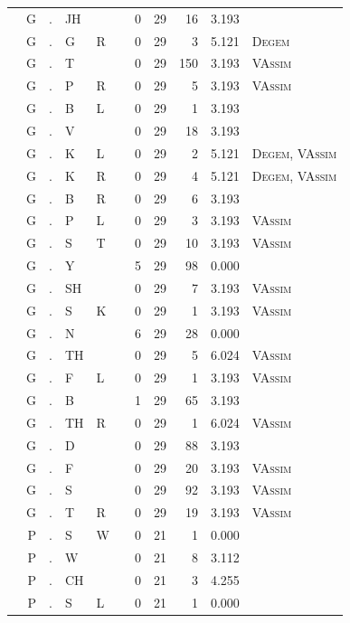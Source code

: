 \documentclass[12pt]{article}
\begin{document}
\begin{longtable}{r@{ } r@{ } c@{ } l@{ } l@{ } l@{ } r r r r l }
 & G & . & JH &  &  & 0 & 29 & 16 & 3.193 &  \\
 & G & . & G & R &  & 0 & 29 & 3 & 5.121 & \textsc{Degem} \\
 & G & . & T &  &  & 0 & 29 & 150 & 3.193 & \textsc{VAssim} \\
 & G & . & P & R &  & 0 & 29 & 5 & 3.193 & \textsc{VAssim} \\
 & G & . & B & L &  & 0 & 29 & 1 & 3.193 &  \\
 & G & . & V &  &  & 0 & 29 & 18 & 3.193 &  \\
 & G & . & K & L &  & 0 & 29 & 2 & 5.121 & \textsc{Degem}, \textsc{VAssim} \\
 & G & . & K & R &  & 0 & 29 & 4 & 5.121 & \textsc{Degem}, \textsc{VAssim} \\
 & G & . & B & R &  & 0 & 29 & 6 & 3.193 &  \\
 & G & . & P & L &  & 0 & 29 & 3 & 3.193 & \textsc{VAssim} \\
 & G & . & S & T &  & 0 & 29 & 10 & 3.193 & \textsc{VAssim} \\
 & G & . & Y &  &  & 5 & 29 & 98 & 0.000 &  \\
 & G & . & SH &  &  & 0 & 29 & 7 & 3.193 & \textsc{VAssim} \\
 & G & . & S & K &  & 0 & 29 & 1 & 3.193 & \textsc{VAssim} \\
 & G & . & N &  &  & 6 & 29 & 28 & 0.000 &  \\
 & G & . & TH &  &  & 0 & 29 & 5 & 6.024 & \textsc{VAssim} \\
 & G & . & F & L &  & 0 & 29 & 1 & 3.193 & \textsc{VAssim} \\
 & G & . & B &  &  & 1 & 29 & 65 & 3.193 &  \\
 & G & . & TH & R &  & 0 & 29 & 1 & 6.024 & \textsc{VAssim} \\
 & G & . & D &  &  & 0 & 29 & 88 & 3.193 &  \\
 & G & . & F &  &  & 0 & 29 & 20 & 3.193 & \textsc{VAssim} \\
 & G & . & S &  &  & 0 & 29 & 92 & 3.193 & \textsc{VAssim} \\
 & G & . & T & R &  & 0 & 29 & 19 & 3.193 & \textsc{VAssim} \\
 & P & . & S & W &  & 0 & 21 & 1 & 0.000 &  \\
 & P & . & W &  &  & 0 & 21 & 8 & 3.112 &  \\
 & P & . & CH &  &  & 0 & 21 & 3 & 4.255 &  \\
 & P & . & S & L &  & 0 & 21 & 1 & 0.000 &  \\

\end{longtable}
\end{document}
